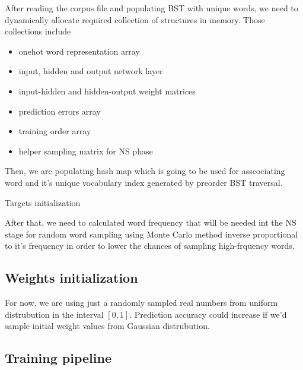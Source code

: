 \documentclass{article}
\newcommand{\SetAlgoStyle}{
	\SetAlgoNoLine
	\SetAlgoNoEnd
	\DontPrintSemicolon
}
\begin{document}
\medbreak

After reading the corpus file and populating BST with unique words, we need to
dynamically allocate required collection of structures in memory. Those
collections include

\begin{itemize}
	\item onehot word representation array
	\item input, hidden and output network layer
	\item input-hidden and hidden-output weight matrices
	\item prediction errors array
	\item training order array
	\item helper sampling matrix for NS phase
\end{itemize}

\medbreak

Then, we are populating hash map which is going to be used for asscociating
word and it's unique vocabulary index generated by preorder BST traversal.

\begin{algorithm}[H]
	\SetAlgoStyle
	\caption{Targets initialization}
\end{algorithm}

\medbreak

After that, we need to calculated word frequency that will be needed
int the NS stage for random word sampling using Monte Carlo method inverse
proportional to it's frequency in order to lower the chances of sampling
high-frquency words.

\subsection{Weights initialization}

For now, we are using just a randomly sampled real numbers from uniform distrubution in the interval
$[0, 1]$. Prediction accuracy could increase if we'd sample initial weight values from Gaussian
distrubution.

\subsection{Training pipeline}
\end{document}
